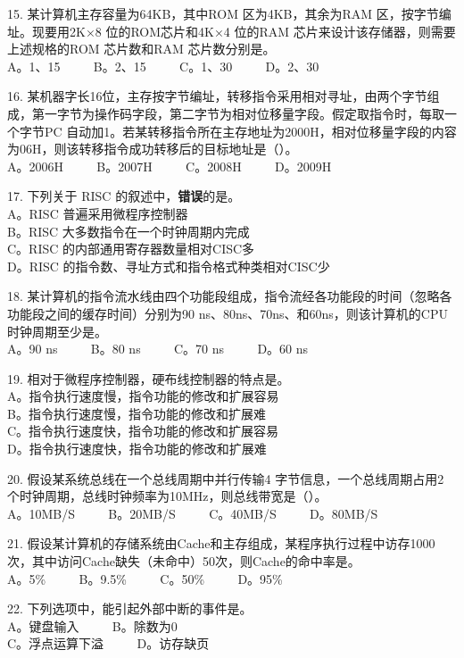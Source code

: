 15. 某计算机主存容量为64KB，其中ROM 区为4KB，其余为RAM 区，按字节编址。现要用2K×8 位的ROM芯片和4K×4 位的RAM 芯片来设计该存储器，则需要上述规格的ROM 芯片数和RAM 芯片数分别是。 \\
A。1、15 $\qquad$ B。2、15 $\qquad$ C。1、30 $\qquad$ D。2、30

16. 某机器字长16位，主存按字节编址，转移指令采用相对寻址，由两个字节组成，第一字节为操作码字段，第二字节为相对位移量字段。假定取指令时，每取一个字节PC 自动加1。若某转移指令所在主存地址为2000H，相对位移量字段的内容为06H，则该转移指令成功转移后的目标地址是（）。 \\
A。2006H $\qquad$ B。2007H $\qquad$ C。2008H $\qquad$ D。2009H

17. 下列关于 RISC 的叙述中，\textbf{错误}的是。 \\
A。RISC 普遍采用微程序控制器 \\
B。RISC 大多数指令在一个时钟周期内完成 \\
C。RISC 的内部通用寄存器数量相对CISC多 \\
D。RISC 的指令数、寻址方式和指令格式种类相对CISC少

18. 某计算机的指令流水线由四个功能段组成，指令流经各功能段的时间（忽略各功能段之间的缓存时间）分别为90 ns、80ns、70ns、和60ns，则该计算机的CPU时钟周期至少是。 \\
A。90 ns $\qquad$ B。80 ns $\qquad$ C。70 ns $\qquad$ D。60 ns

19. 相对于微程序控制器，硬布线控制器的特点是。 \\
A。指令执行速度慢，指令功能的修改和扩展容易 \\
B。指令执行速度慢，指令功能的修改和扩展难 \\
C。指令执行速度快，指令功能的修改和扩展容易 \\
D。指令执行速度快，指令功能的修改和扩展难

20. 假设某系统总线在一个总线周期中并行传输4 字节信息，一个总线周期占用2 个时钟周期，总线时钟频率为10MHz，则总线带宽是（）。 \\
A。10MB/S $\qquad$ B。20MB/S $\qquad$ C。40MB/S $\qquad$ D。80MB/S

21. 假设某计算机的存储系统由Cache和主存组成，某程序执行过程中访存1000次，其中访问Cache缺失（未命中）50次，则Cache的命中率是。 \\
A。5\% $\qquad$ B。9.5\% $\qquad$ C。50\% $\qquad$ D。95\%

22. 下列选项中，能引起外部中断的事件是。 \\
A。键盘输入 $\qquad$ B。除数为0 \\
C。浮点运算下溢  $\qquad$ D。访存缺页

